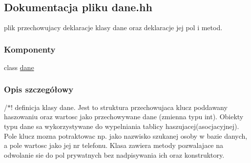 \hypertarget{dane_8hh}{}\subsection{Dokumentacja pliku dane.\+hh}
\label{dane_8hh}


plik przechowujacy deklaracje klasy dane oraz deklaracje jej pol i metod.  


\subsubsection*{Komponenty}
\begin{DoxyCompactItemize}
\item 
class \hyperlink{classdane}{dane}
\end{DoxyCompactItemize}


\subsubsection{Opis szczegółowy}
/$\ast$! definicja klasy dane. Jest to struktura przechowujaca klucz poddawany haszowaniu oraz wartosc jako przechowywane dane (zmienna typu int). Obiekty typu dane sa wykorzystywane do wypelniania tablicy haszujacej(asocjacyjnej). Pole klucz mozna potraktowac np. jako nazwisko szukanej osoby w bazie danych, a pole wartosc jako jej nr telefonu. Klasa zawiera metody pozwalajace na odwolanie sie do pol prywatnych bez nadpisywania ich oraz konstruktory. 